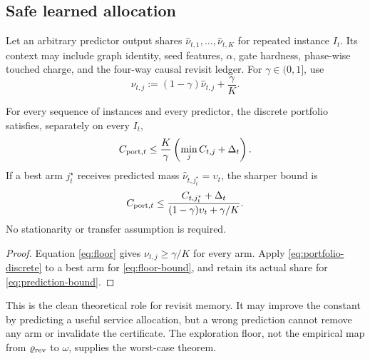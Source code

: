 \subsection{Safe learned allocation}

Let an arbitrary predictor output shares
$\widehat\nu_{t,1},\ldots,\widehat\nu_{t,K}$ for repeated instance $I_t$.
Its context may include graph identity, seed features, $\alpha$, gate
hardness, phase-wise touched charge, and the four-way causal revisit ledger.
For $\gamma\in(0,1]$, use
\begin{equation}
 \nu_{t,j}:=(1-\gamma)\widehat\nu_{t,j}+\frac{\gamma}{K}.
 \label{eq:floor}
\end{equation}

\begin{corollary}
\label{cor:learned-safe}
For every sequence of instances and every predictor, the discrete portfolio
satisfies, separately on every $I_t$,
\begin{equation}
 C_{{\rm port},t}
 \leq\frac{K}{\gamma}
       \left(\min_j C_{t,j}+\Delta_t\right).
 \label{eq:floor-bound}
\end{equation}
If a best arm $j_t^\star$ receives predicted mass
$\widehat\nu_{t,j_t^\star}=\upsilon_t$, the sharper bound is
\begin{equation}
 C_{{\rm port},t}
 \leq
 \frac{C_{t,j_t^\star}+\Delta_t}
 {(1-\gamma)\upsilon_t+\gamma/K}.
 \label{eq:prediction-bound}
\end{equation}
No stationarity or transfer assumption is required.
\end{corollary}

\begin{proof}
Equation \eqref{eq:floor} gives $\nu_{t,j}\geq\gamma/K$ for every arm.
Apply \eqref{eq:portfolio-discrete} to a best arm for
\eqref{eq:floor-bound}, and retain its actual share for
\eqref{eq:prediction-bound}.
\end{proof}

This is the clean theoretical role for revisit memory.  It may improve the
constant by predicting a useful service allocation, but a wrong prediction
cannot remove any arm or invalidate the certificate.  The exploration floor,
not the empirical map from $\varrho_{\rm rev}$ to $\omega$, supplies the
worst-case theorem.
